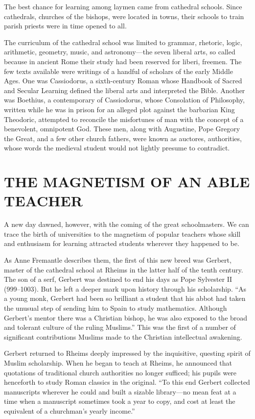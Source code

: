 The best chance for learning among laymen came from cathedral schools. Since cathedrals, churches of
the bishops, were located in towns, their schools to train parish priests were in time opened to
all.

The curriculum of the cathedral school was limited to grammar, rhetoric, logic, arithmetic,
geometry, music, and astronomy—the seven liberal arts, so called because in ancient Rome their study
had been reserved for liberi, freemen. The few texts available were writings of a handful of
scholars of the early Middle Ages. One was Cassiodorus, a sixth-century Roman whose Handbook of
Sacred and Secular Learning defined the liberal arts and interpreted the Bible. Another was
Boethius, a contemporary of Cassiodorus, whose Consolation of Philosophy, written while he was in
prison for an alleged plot against the barbarian King Theodoric, attempted to reconcile the
misfortunes of man with the concept of a benevolent, omnipotent God. These men, along with
Augustine, Pope Gregory the Great, and a few other church fathers, were known as auctores,
authorities, whose words the medieval student would not lightly presume to contradict.

\section{THE MAGNETISM OF AN ABLE TEACHER}

A new day dawned, however, with the coming of the great schoolmasters. We can trace the birth of
universities to the magnetism of popular teachers whose skill and enthusiasm for learning attracted
students wherever they happened to be.

As Anne Fremantle describes them, the first of this new breed was Gerbert, master of the cathedral
school at Rheims in the latter half of the tenth century. The son of a serf, Gerbert was destined to
end his days as Pope Sylvester II (999–1003). But he left a deeper mark upon history through his
scholarship. “As a young monk, Gerbert had been so brilliant a student that his abbot had taken the
unusual step of sending him to Spain to study mathematics. Although Gerbert’s mentor there was a
Christian bishop, he was also exposed to the broad and tolerant culture of the ruling Muslims.” This
was the first of a number of significant contributions Muslims made to the Christian intellectual
awakening.

Gerbert returned to Rheims deeply impressed by the inquisitive, questing spirit of Muslim
scholarship. When he began to teach at Rheims, he announced that quotations of traditional church
authorities no longer sufficed; his pupils were henceforth to study Roman classics in the original.
“To this end Gerbert collected manuscripts wherever he could and built a sizable library—no mean
feat at a time when a manuscript sometimes took a year to copy, and cost at least the equivalent of
a churchman’s yearly income.”

